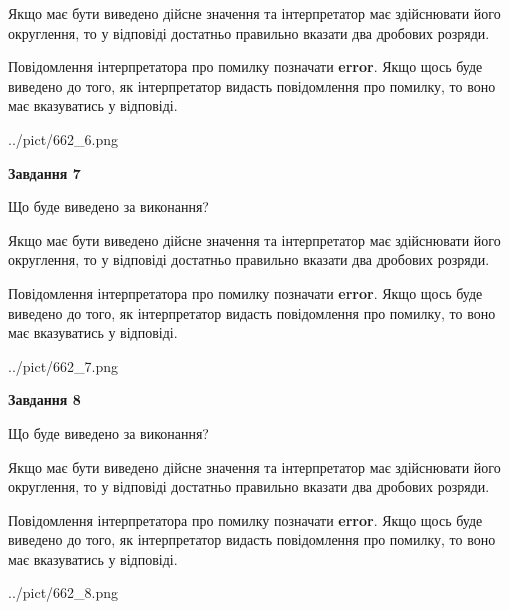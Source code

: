 \documentclass[12pt, ukrainian]{article}
\begin{document}
{\begin {Large}
Якщо має бути виведено дійсне значення та інтерпретатор має здійснювати його округлення, 
то у відповіді достатньо правильно вказати два дробових розряди.

Повідомлення інтерпретатора про помилку позначати \textbf{error}.
Якщо щось буде виведено до того, як інтерпретатор видасть повідомлення про помилку, 
то воно має вказуватись у відповіді. \par

\begin{center}
	{../pict/662_6.png}
\end{center}
\newpage

{\begin {center}\textbf{Завдання 7}\end {center}}\par
Що буде виведено за виконання? \par

Якщо має бути виведено дійсне значення та інтерпретатор має здійснювати його округлення, 
то у відповіді достатньо правильно вказати два дробових розряди.

Повідомлення інтерпретатора про помилку позначати \textbf{error}.
Якщо щось буде виведено до того, як інтерпретатор видасть повідомлення про помилку, 
то воно має вказуватись у відповіді. \par

\begin{center}
	{../pict/662_7.png}
\end{center}
\newpage

{\begin {center}\textbf{Завдання 8}\end {center}}\par
Що буде виведено за виконання? \par

Якщо має бути виведено дійсне значення та інтерпретатор має здійснювати його округлення, 
то у відповіді достатньо правильно вказати два дробових розряди.

Повідомлення інтерпретатора про помилку позначати \textbf{error}.
Якщо щось буде виведено до того, як інтерпретатор видасть повідомлення про помилку, 
то воно має вказуватись у відповіді. \par

\begin{center}
	{../pict/662_8.png}
\end{center}
\newpage


\end{Large}}
\end{document}
